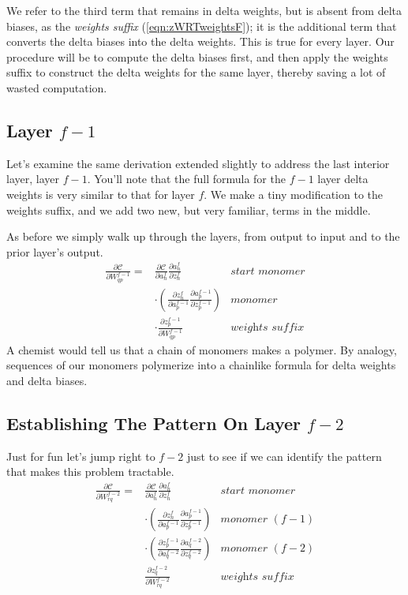 \documentclass[twocolumn]{revtex4-1}
\newcommand{\cC}{\mathscr{C}}
\newcommand{\parpar}[2]{\frac{\partial #1}{\partial #2}}
\begin{document}
We refer to the third term that remains in delta weights, but is absent from delta biases, as the \textit{weights suffix}  (\ref{eqn:zWRTweightsF}); it is the additional term that converts the delta biases into the delta weights. This is true for every layer. Our procedure will be to compute the delta biases first, and then apply the weights suffix to construct the delta weights for the same layer, thereby saving a lot of wasted computation.

\subsection{Layer $f-1$}
Let's examine the same derivation extended slightly to address the last interior layer, layer $f-1$. You'll note that the full formula for the $f-1$ layer delta weights is very similar to that for layer $f$. We make a tiny modification to the weights suffix, and we add two new, but very familiar, terms in the middle.

As before we simply walk up through the layers, from output to input and to the prior layer's output.
\begin{align}
    \parpar{\cC}{W^{f-1}_{q p}} = & \parpar{\cC}{a^f_n} \parpar{a^f_n}{z^f_n} & \textit{start monomer}\nonumber \\
    & \cdot \left(\parpar{z^f_n}{a^{f-1}_p} \parpar{a^{f-1}_p}{z^{f-1}_p} \right) & \textit{monomer}\nonumber \\
    & \cdot \parpar{z^{f-1}_p}{W^{f-1}_{q p}} & \textit{weights suffix}
\end{align}
A chemist would tell us that a chain of monomers makes a polymer. By analogy, sequences of our monomers polymerize into a chainlike formula for delta weights and delta biases.

\subsection{Establishing The Pattern On Layer $f-2$}
Just for fun let's jump right to $f-2$ just to see if we can identify the pattern that makes this problem tractable.
\begin{align}
    \parpar{\cC}{W^{f-2}_{r q}} = & \parpar{\cC}{a^f_n} \parpar{a^f_n}{z^f_n} & \textit{start monomer} \nonumber \\
        & \cdot \left(\parpar{z^f_n}{a^{f-1}_p} \parpar{a^{f-1}_p}{z^{f-1}_p} \right) & \textit{monomer $(f-1)$} \nonumber \\
        & \cdot \left(\parpar{z^{f-1}_p}{a^{f-2}_q} \parpar{a^{f-2}_q}{z^{f-2}_q} \right) & \textit{monomer $(f-2)$} \nonumber \\
        & \parpar{z^{f-2}_q}{W^{f-2}_{r q}} & \textit{weights suffix}
\end{align}
\end{document}
